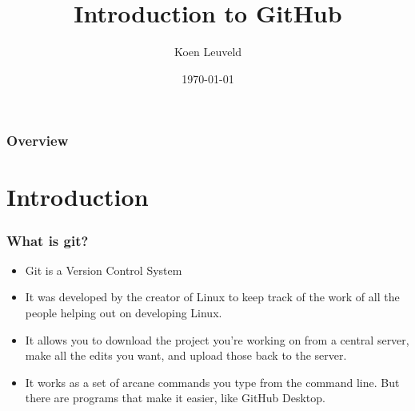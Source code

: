 \documentclass{beamer}
\title[Git]{Introduction to GitHub} %
\author{Koen Leuveld} %
\institute[EDI] %
{
EDI \\ %
\medskip
\textit{k.leuveld@surveybe.com} %
}
\date{\today} %
\begin{document}
\begin{frame}
\titlepage %
\end{frame}

\begin{frame}
\frametitle{Overview} %
\tableofcontents %
\end{frame}


\section{Introduction} %


\begin{frame}
\frametitle{What is git?}
	\begin{itemize}
		\item Git is a Version Control System
		\item It was developed by the creator of Linux to keep track of the work of all the people helping out on developing Linux.
		\item It allows you to download the project you’re working on from a central server, make all the edits you want, and upload those back to the server.
		\item It works as a set of arcane commands you type from the command line. But there are programs that make it easier, like GitHub Desktop.
	\end{itemize}
\end{frame}
\end{document}
